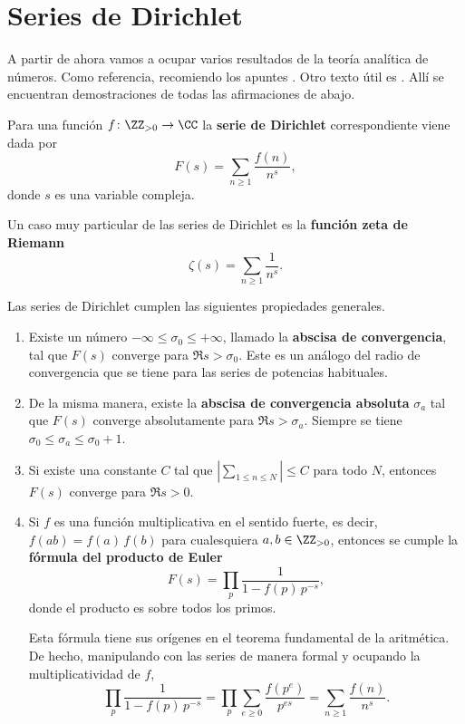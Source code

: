 \section{Series de Dirichlet}

A partir de ahora vamos a ocupar varios resultados de la teoría analítica de
números. Como referencia, recomiendo los apuntes \cite{Everiste-ANT}. Otro texto
útil es \cite{Hlawka-Taschner-Schoissengeier}. Allí se encuentran demostraciones
de todas las afirmaciones de abajo.

\begin{definicion}
  Para una función $f\colon \ZZ_{>0} \to \CC$ la \textbf{serie de Dirichlet}
  correspondiente viene dada por
  $$F (s) = \sum_{n\ge 1} \frac{f(n)}{n^s},$$
  donde $s$ es una variable compleja.
\end{definicion}

Un caso muy particular de las series de Dirichlet es la
\textbf{función zeta de Riemann}
$$\zeta (s) = \sum_{n\ge 1} \frac{1}{n^s}.$$

Las series de Dirichlet cumplen las siguientes propiedades generales.

\begin{enumerate}
\item Existe un número $-\infty \le \sigma_0 \le +\infty$, llamado
  la \textbf{abscisa de convergencia}, tal que $F (s)$ converge para
  $\Re s > \sigma_0$. Este es un análogo del radio de convergencia que se tiene
  para las series de potencias habituales.

\item De la misma manera, existe la \textbf{abscisa de convergencia absoluta}
  $\sigma_a$ tal que $F (s)$ converge absolutamente para $\Re s > \sigma_a$.
  Siempre se tiene $\sigma_0 \le \sigma_a \le \sigma_0 + 1$.

\item Si existe una constante $C$ tal que
  $\left|\sum_{1 \le n\le N}\right| \le C$ para todo $N$, entonces $F (s)$
  converge para $\Re s > 0$.

\item Si $f$ es una función multiplicativa en el sentido fuerte, es decir,
  $f (ab) = f (a)\,f (b)$ para cualesquiera $a, b \in \ZZ_{> 0}$, entonces se
  cumple la \textbf{fórmula del producto de Euler}
  $$F (s) = \prod_p \frac{1}{1 - f (p)\,p^{-s}},$$
  donde el producto es sobre todos los primos.

  Esta fórmula tiene sus orígenes en el teorema fundamental de la aritmética.
  De hecho, manipulando con las series de manera formal y ocupando
  la multiplicatividad de $f$,
  \[ \prod_p \frac{1}{1 - f (p)\,p^{-s}} =
     \prod_p \sum_{e \ge 0} \frac{f (p^e)}{p^{es}} =
     \sum_{n\ge 1} \frac{f (n)}{n^s}. \]
\end{enumerate}

